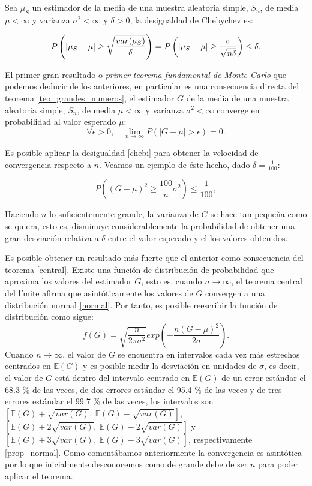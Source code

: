 \documentclass[../proyecto.tex]{memoir}
\begin{document}
\begin{defi} \label{chebi}
Sea $\mu_S$ un estimador de la media de una muestra aleatoria simple, $S_n$, de media $\mu < \infty$ y varianza $\sigma^2  < \infty$ y $\delta>0$, la desigualdad de Chebychev es:

$$
P \left( \abs{\mu_S-\mu} \geq \sqrt{\frac{var(\mu_S)}{\delta}} \right) = P \left( \abs{\mu_S-\mu} \geq \frac{\sigma}{\sqrt{n\delta}} \right)  \leq \delta.
$$

\end{defi}

El primer gran resultado o \textit{primer teorema fundamental de Monte Carlo} que podemos deducir de los anteriores, en particular es una consecuencia directa del teorema \ref{teo_grandes_numeros}, el estimador $G$ de la media de una muestra aleatoria simple, $S_n$, de media $\mu < \infty$ y varianza $\sigma^2 < \infty$ converge en probabilidad al valor esperado $\mu$:
$$
\forall \epsilon > 0,\quad \lim_{n\to\infty} P( |G - \mu|> \epsilon ) = 0.
$$

Es posible aplicar la desigualdad \ref{chebi} para obtener la velocidad de convergencia respecto a $n$. Veamos un ejemplo de éste hecho, dado $\delta=\frac{1}{100}$:

$$
P \left( ( G - \mu )^2 \geq \frac{100}{n} \sigma^2 \right)  \leq \frac{1}{100},
$$

Haciendo $n$ lo suficientemente grande, la varianza de $G$ se hace tan pequeña como se quiera, esto es, disminuye considerablemente la probabilidad de obtener una gran desviación relativa a $\delta$ entre el valor esperado y el los valores obtenidos.

Es posible obtener un resultado más fuerte que el anterior como consecuencia  del teorema \ref{central}. Existe una función de distribución de probabilidad que aproxima los valores del estimador $G$, esto es, cuando $n \to\infty$, el teorema central del límite afirma que asintóticamente los valores de $G$ convergen a una distribución normal \ref{normal}. Por tanto, es posible reescribir la función de distribución como sigue:
$$
f(G) = \sqrt{\frac{n}{2 \pi \sigma^2}} exp \left( - \frac{n(G-\mu)^2}{2\sigma} \right).
$$
Cuando $n \to\infty$, el valor de $G$ se encuentra en intervalos cada vez más estrechos centrados en $\mathds{E}(G)$ y es posible medir la desviación en unidades de $\sigma$, es decir, el valor de $G$ está dentro del intervalo centrado en $\mathds{E}(G)$ de un error estándar el 68.3 \% de las veces, de dos errores estándar el 95.4 \% de las veces y de tres errores estándar el 99.7 \%  de las veces, los intervalos son $[\mathds{E}(G)+\sqrt{var(G)},\ \mathds{E}(G)-\sqrt{var(G)}]$, $[\mathds{E}(G)+2\sqrt{var(G)},\ \mathds{E}(G)-2\sqrt{var(G)}]$ y $[\mathds{E}(G)+3\sqrt{var(G)},\ \mathds{E}(G)-3\sqrt{var(G)}]$, respectivamente \ref{prop_normal}. Como comentábamos anteriormente la convergencia es asintótica por lo que inicialmente desconocemos como de grande debe de ser $n$ para poder aplicar el teorema.
\end{document}
